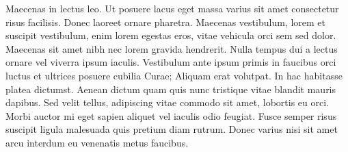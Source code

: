 Maecenas in lectus leo. Ut posuere lacus eget massa varius sit amet consectetur risus facilisis. Donec laoreet ornare pharetra. Maecenas vestibulum, lorem et suscipit vestibulum, enim lorem egestas eros, vitae vehicula orci sem sed dolor. Maecenas sit amet nibh nec lorem gravida hendrerit. Nulla tempus dui a lectus ornare vel viverra ipsum iaculis. Vestibulum ante ipsum primis in faucibus orci luctus et ultrices posuere cubilia Curae; Aliquam erat volutpat. In hac habitasse platea dictumst. Aenean dictum quam quis nunc tristique vitae blandit mauris dapibus. Sed velit tellus, adipiscing vitae commodo sit amet, lobortis eu orci. Morbi auctor mi eget sapien aliquet vel iaculis odio feugiat. Fusce semper risus suscipit ligula malesuada quis pretium diam rutrum. Donec varius nisi sit amet arcu interdum eu venenatis metus faucibus. 
